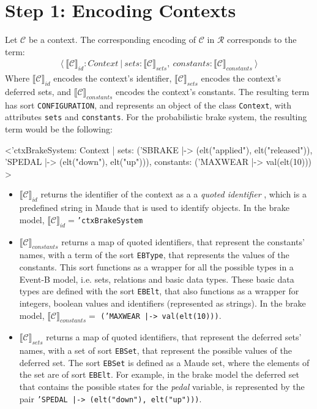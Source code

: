 \section{Step 1: Encoding Contexts}
Let $\mathscr{C}$ be a context. The corresponding encoding of $\mathscr{C}$ in $\mathscr{R}$ corresponds to the term:
    \begin{align*}
    \langle \ \llbracket \mathscr{C} \rrbracket_{id} : Context \ | \ sets: \llbracket \mathscr{C} \rrbracket_{sets} , \ constants: \llbracket \mathscr{C} \rrbracket_{constants} \ \rangle
    \end{align*}   
Where $\llbracket \mathscr{C} \rrbracket_{id}$ encodes the context's identifier, $\llbracket \mathscr{C} \rrbracket_{sets}$ encodes the context's deferred sets, and $\llbracket \mathscr{C} \rrbracket_{constants}$ encodes the context's constants. The resulting term has sort \texttt{CONFIGURATION}, and represents an object of the class \texttt{Context}, with attributes \texttt{sets} and \texttt{constants}. For the probabilistic brake system, the resulting term would be the following:
\begin{maude}

<'ctxBrakeSystem: Context | 
                  sets: ('SBRAKE |-> (elt("applied"), elt("released")), 
                         'SPEDAL |-> (elt("down"), elt("up"))),
                  constants: ('MAXWEAR |-> val(elt(10))) >
\end{maude}
\begin{itemize}
    \item $\llbracket \mathscr{C} \rrbracket_{id}$ returns the identifier of the context as a a \textit{quoted identifier} \cite{MaudeManual}, which is a predefined string in Maude that is used to identify objects. In the brake model, $\llbracket \mathscr{C} \rrbracket_{id} = $\texttt{'ctxBrakeSystem}
    \item $\llbracket \mathscr{C} \rrbracket_{constants}$ returns a map of quoted identifiers, that represent the constants' names, with a term of the sort \texttt{EBType}, that represents the values of the constants. This sort functions as a wrapper for all the possible types in a Event-B model, i.e. sets, relations and basic data types. These basic data types are defined with the sort \texttt{EBElt}, that also functions as a wrapper for integers, boolean values and identifiers (represented as strings).  In the brake model, $\llbracket \mathscr{C} \rrbracket_{constants} = $ \texttt{('MAXWEAR |-> val(elt(10)))}.
    
    \item $\llbracket \mathscr{C} \rrbracket_{sets}$ returns a map of quoted identifiers, that represent the deferred sets' names, with a set of sort \texttt{EBSet}, that represent the possible values of the deferred set. The sort \texttt{EBSet} is defined as a Maude set, where the elements of the set are of sort \texttt{EBElt}. For example, in the brake model the deferred set that contains the possible states for the \textit{pedal} variable, is represented by the pair \texttt{'SPEDAL |-> (elt("down"), elt("up")))}.
\end{itemize}

